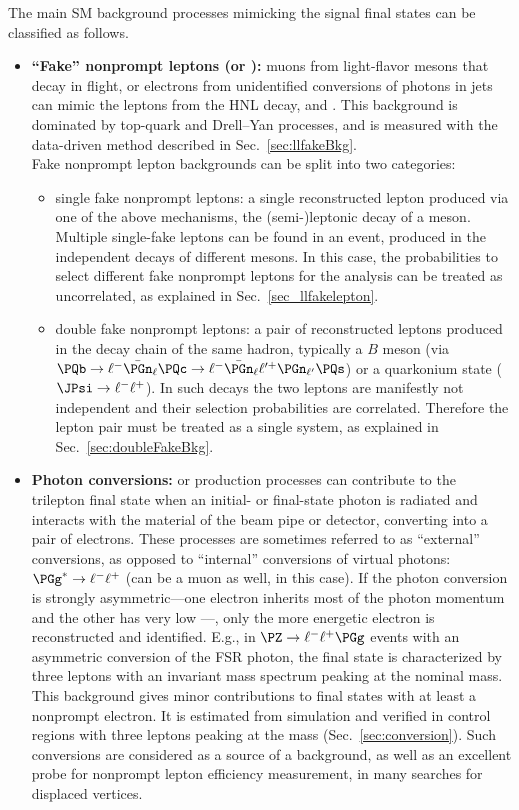 The main SM background processes mimicking the signal final states can be
classified as follows.
\begin{itemize}
\item \textbf{``Fake'' nonprompt leptons (\Pe or \PGm):}
  muons from light-flavor mesons that decay in flight, or electrons from
  unidentified conversions of photons in jets
  can mimic the \displ leptons from the HNL decay, \ltwo and
  \lthree.
  This background is dominated by top-quark and Drell--Yan processes,
  and is measured with the data-driven method described in
  Sec.~\ref{sec:llfakeBkg}.\\
  Fake nonprompt lepton backgrounds can be split into two categories:
  \begin{itemize}
  \item single fake nonprompt leptons:
    a single reconstructed lepton produced via one of the above
    mechanisms, \eg the (semi-)leptonic decay of a meson.
    Multiple single-fake leptons can be found in an event,
    produced in the independent decays of different mesons.
    In this case, the probabilities to select different fake nonprompt
    leptons for the analysis can be treated as uncorrelated, as
    explained in Sec.~\ref{sec_llfakelepton}.
  \item double fake nonprompt leptons:
    a pair of reconstructed leptons produced in the decay chain of the
    same hadron, typically a $B$ meson (\eg via
    $\PQb\to\ell^-\bar{\PGn}_{\ell}\PQc\to\ell^-\bar{\PGn}_{\ell}\ell^{\prime+}\PGn_{\ell^{\prime}}\PQs$)
    or a quarkonium state (\eg $\JPsi\to\ell^-\ell^+$).
    In such decays the two leptons are manifestly not independent and
    their selection probabilities are correlated.
    Therefore the lepton pair must be treated as a single system, as
    explained in Sec.~\ref{sec:doubleFakeBkg}.
  \end{itemize}
\item \textbf{Photon conversions:}
  \PW or \PZ production processes can
  contribute to the trilepton final state when an initial- or
  final-state photon is radiated and interacts with the material of
  the beam pipe or detector, converting into a pair of electrons.
  These processes are sometimes referred to as ``external''
  conversions, as opposed to ``internal'' conversions of virtual
  photons: $\PGg^\ast\to\ell^-\ell^+$ (\lept can be a muon as well, in
  this case).
  If the photon conversion is strongly asymmetric---\ie one electron
  inherits most of the photon momentum and the other has very low
  \pt---, only the more energetic electron is reconstructed and
  identified. E.g., in $\PZ\to\ell^-\ell^+\PGg$ events with an
  asymmetric conversion of the FSR photon, the final state is
  characterized by three leptons with an invariant mass spectrum
  peaking at the nominal \PZ mass.
  This background gives minor contributions
  to final states with at least a nonprompt electron.
  It is estimated from simulation and verified in control regions with
  three leptons peaking at the \PZ mass (Sec.~\ref{sec:conversion}).
  Such conversions are considered as a
  source of a background, as well as an excellent probe for nonprompt
  lepton efficiency
 measurement, in many searches for displaced vertices.


\end{itemize}
